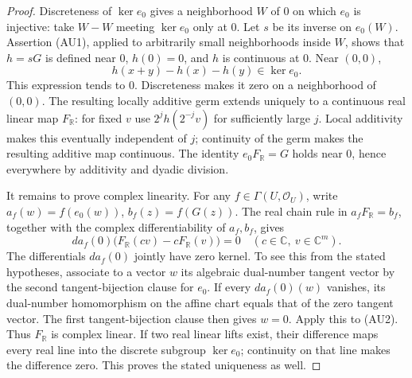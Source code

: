 \begin{proof}
Discreteness of \(\ker e_0\) gives a neighborhood \(W\) of \(0\)
on which \(e_0\) is injective: take \(W-W\) meeting
\(\ker e_0\) only at \(0\).
Let \(s\) be its inverse on \(e_0(W)\).
Assertion (AU1), applied to arbitrarily small neighborhoods
inside \(W\), shows that \(h=sG\) is defined near \(0\),
\(h(0)=0\), and \(h\) is continuous at \(0\).
Near \((0,0)\),
\[
                    h(x+y)-h(x)-h(y)\in\ker e_0.
\]
This expression tends to \(0\).
Discreteness makes it zero on a neighborhood of \((0,0)\).
The resulting locally additive germ extends uniquely to a
continuous real linear map \(F_{\mathbb R}\):
for fixed \(v\) use
\(2^j h(2^{-j}v)\) for sufficiently large \(j\).
Local additivity makes this eventually independent of \(j\);
continuity of the germ makes the resulting additive map continuous.
The identity \(e_0F_{\mathbb R}=G\) holds near \(0\), hence
everywhere by additivity and dyadic division.

It remains to prove complex linearity.
For any \(f\in\Gamma(U,\mathcal O_U)\), write
\(a_f(w)=f(e_0(w))\), \(b_f(z)=f(G(z))\).
The real chain rule in \(a_fF_{\mathbb R}=b_f\), together
with the complex differentiability of \(a_f,b_f\), gives
\[
       d a_f(0)\bigl(F_{\mathbb R}(cv)-cF_{\mathbb R}(v)\bigr)=0
                         \quad(c\in\mathbb C,\ v\in\mathbb C^m).
                                                               \tag{AU2}
\]
The differentials \(da_f(0)\) jointly have zero kernel.
To see this from the stated hypotheses, associate to a vector \(w\)
its algebraic dual-number tangent vector by the second
tangent-bijection clause for \(e_0\).
If every \(da_f(0)(w)\) vanishes, its dual-number homomorphism
on the affine chart equals that of the zero tangent vector.
The first tangent-bijection clause then gives \(w=0\).
Apply this to (AU2).
Thus \(F_{\mathbb R}\) is complex linear.
If two real linear lifts exist, their difference maps every
real line into the discrete subgroup \(\ker e_0\); continuity
on that line makes the difference zero.
This proves the stated uniqueness as well.
\end{proof}

